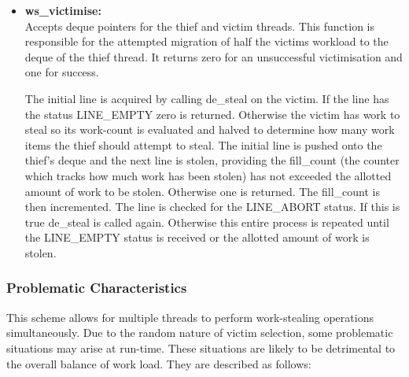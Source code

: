 \begin{itemize}
\item \textbf{ws\_victimise: } \\
                Accepts deque pointers for the thief and victim threads. This function is responsible for the attempted migration of half the victims 
                workload to the deque of the thief thread. It returns zero for an unsuccessful victimisation and one for success.
                
                The initial line is acquired by calling de\_steal on the victim. If the line has the status LINE\_EMPTY zero is returned. 
                Otherwise the victim has work to steal so its work-count is evaluated and halved to determine how many work items the thief
                should attempt to steal.
                The initial line is pushed onto the thief's deque and the next line is stolen, providing the fill\_count (the counter which
                tracks how much work has been stolen) has not exceeded the allotted amount of work to be stolen. Otherwise one is returned.
                The fill\_count is then incremented. 
                The line is checked for the LINE\_ABORT status. If this is true de\_steal is called again.
                Otherwise this entire process is repeated until the LINE\_EMPTY status is received or the allotted amount of work is stolen.
\end{itemize}

\subsubsection*{Problematic Characteristics}

This scheme allows for multiple threads to perform work-stealing operations simultaneously. 
Due to the random nature of victim selection, some problematic situations may arise at run-time.
These situations are likely to be detrimental to the overall balance of work load.
They are described as follows:

